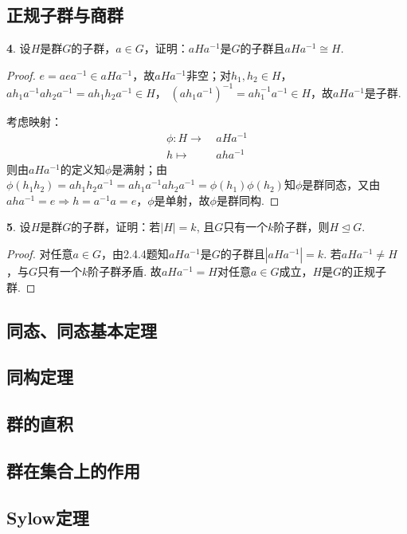 \subsection{正规子群与商群}

\par \textbf{4}.
设$H$是群$G$的子群，$a\in G$，证明：$aHa^{-1}$是$G$的子群且$aHa^{-1}\cong H$.

\begin{proof}
$e=aea^{-1}\in aHa^{-1}$，故$aHa^{-1}$非空；对$h_1,h_2\in H$，$ah_1a^{-1}ah_2a^{-1}=ah_1h_2a^{-1}\in H$， $(ah_1a^{-1})^{-1}=ah^{-1}_1a^{-1}\in H$，故$aHa^{-1}$是子群. 
\par 考虑映射：
\begin{align*}
    \phi:H\rightarrow& \ aHa^{-1}\\
    h\mapsto&  \ aha^{-1}
\end{align*}
则由$aHa^{-1}$的定义知$\phi$是满射；由$\phi(h_1h_2)=ah_1h_2a^{-1}=ah_1a^{-1}ah_2a^{-1}=\phi(h_1)\phi(h_2)$知$\phi$是群同态，又由$aha^{-1}=e \Rightarrow h=a^{-1}a=e$，$\phi$是单射，故$\phi$是群同构.
\end{proof}

\par \textbf{5}. 设$H$是群$G$的子群，证明：若$|H|=k$, 且$G$只有一个$k$阶子群，则$H \unlhd G$.

\begin{proof}
对任意$a\in G$，由2.4.4题知$aHa^{-1}$是$G$的子群且$|aHa^{-1}|=k$. 若$aHa^{-1}\neq H$，与$G$只有一个$k$阶子群矛盾. 故$aHa^{-1}=H$对任意$a\in G$成立，$H$是$G$的正规子群.
\end{proof}

\subsection{同态、同态基本定理}
\subsection{同构定理}
\subsection{群的直积}
\subsection{群在集合上的作用}
\subsection{Sylow定理}